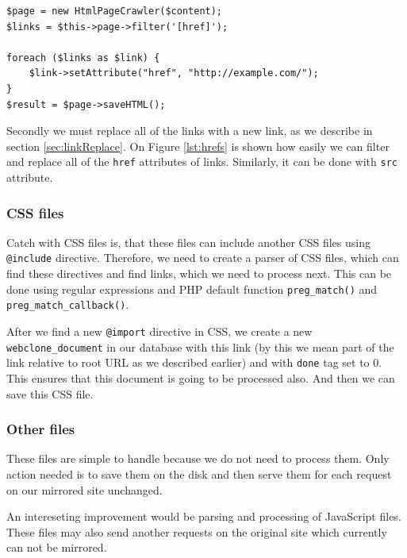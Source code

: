 \begin{lstlisting}[caption={Example of finding and replacing href attributes in an HTML document},label={lst:hrefs}]
$page = new HtmlPageCrawler($content);
$links = $this->page->filter('[href]');

foreach ($links as $link) {
	$link->setAttribute("href", "http://example.com/");
}
$result = $page->saveHTML();
\end{lstlisting}

Secondly we must replace all of the links with a new link, as we describe in section \ref{sec:linkReplace}. On Figure \ref{lst:hrefs} is shown how easily we can filter and replace all of the \texttt{href} attributes of links. Similarly, it can be done with \texttt{src} attribute.

\subsubsection{CSS files}
Catch with CSS files is, that these files can include another CSS files using \texttt{@include} directive. Therefore, we need to create a parser of CSS files, which can find these directives and find links, which we need to process next. This can be done using regular expressions and PHP default function \texttt{preg\_match()} and \texttt{preg\_match\_callback()}.

After we find a new \texttt{@import} directive in CSS, we create a new \texttt{webclone\_document} in our database with this link (by this we mean part of the link relative to root URL as we described earlier) and with \texttt{done} tag set to 0. This ensures that this document is going to be processed also. And then we can save this CSS file.

\subsubsection{Other files}
These files are simple to handle because we do not need to process them. Only action needed is to save them on the disk and then serve them for each request on our mirrored site unchanged.

An intereseting improvement would be parsing and processing of JavaScript files. These files may also send another requests on the original site which currently can not be mirrored.


